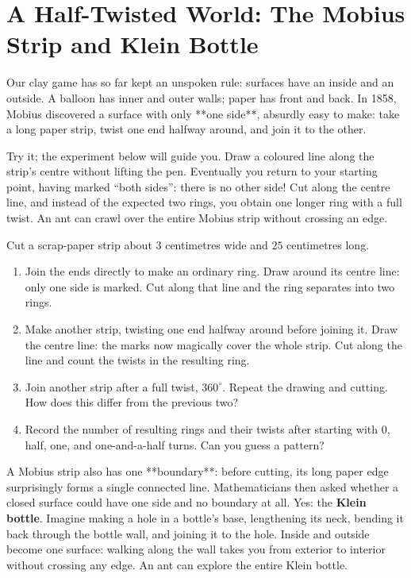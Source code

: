 \section{A Half-Twisted World: The Mobius Strip and Klein Bottle}

Our clay game has so far kept an unspoken rule: surfaces have an inside and an outside. A balloon has inner and outer walls; paper has front and back. In 1858, Mobius discovered a surface with only **one side**, absurdly easy to make: take a long paper strip, twist one end halfway around, and join it to the other.

Try it; the experiment below will guide you. Draw a coloured line along the strip's centre without lifting the pen. Eventually you return to your starting point, having marked ``both sides'': there is no other side! Cut along the centre line, and instead of the expected two rings, you obtain one longer ring with a full twist. An ant can crawl over the entire Mobius strip without crossing an edge.

\begin{shiyan}
Cut a scrap-paper strip about $3$ centimetres wide and $25$ centimetres long.
\begin{enumerate}
  \item Join the ends directly to make an ordinary ring. Draw around its centre line: only one side is marked. Cut along that line and the ring separates into two rings.
  \item Make another strip, twisting one end halfway around before joining it. Draw the centre line: the marks now magically cover the whole strip. Cut along the line and count the twists in the resulting ring.
  \item Join another strip after a full twist, $360^{\circ}$. Repeat the drawing and cutting. How does this differ from the previous two?
  \item Record the number of resulting rings and their twists after starting with $0$, half, one, and one-and-a-half turns. Can you guess a pattern?
\end{enumerate}
\end{shiyan}

A Mobius strip also has one **boundary**: before cutting, its long paper edge surprisingly forms a single connected line. Mathematicians then asked whether a closed surface could have one side and no boundary at all. Yes: the \textbf{Klein bottle}. Imagine making a hole in a bottle's base, lengthening its neck, bending it back through the bottle wall, and joining it to the hole. Inside and outside become one surface: walking along the wall takes you from exterior to interior without crossing any edge. An ant can explore the entire Klein bottle.

